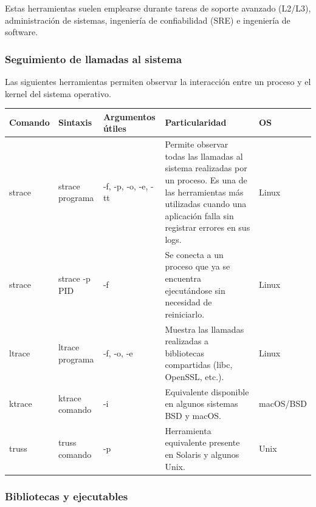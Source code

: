 \documentclass[a4paper,10pt]{article}
\begin{document}
Estas herramientas suelen emplearse durante tareas de soporte avanzado (L2/L3),
administración de sistemas, ingeniería de confiabilidad (SRE) e ingeniería de
software.


\subsubsection{Seguimiento de llamadas al sistema}

Las siguientes herramientas permiten observar la interacción entre un proceso y
el kernel del sistema operativo.

\begin{longtable}{|p{2.8cm}|p{3.3cm}|p{4cm}|p{5.3cm}|p{1.5cm}|}

\hline
Comando &
Sintaxis &
Argumentos útiles &
Particularidad &
OS
\\
\hline
\endhead

strace &
strace programa &
-f, -p, -o, -e, -tt &
Permite observar todas las llamadas al sistema realizadas por un proceso. Es una de las herramientas más utilizadas cuando una aplicación falla sin registrar errores en sus logs.
&
Linux
\\
\hline

strace &
strace -p PID &
-f &
Se conecta a un proceso que ya se encuentra ejecutándose sin necesidad de reiniciarlo.
&
Linux
\\
\hline

ltrace &
ltrace programa &
-f, -o, -e &
Muestra las llamadas realizadas a bibliotecas compartidas (libc, OpenSSL, etc.).
&
Linux
\\
\hline

ktrace &
ktrace comando &
-i &
Equivalente disponible en algunos sistemas BSD y macOS.
&
macOS/BSD
\\
\hline

truss &
truss comando &
-p &
Herramienta equivalente presente en Solaris y algunos Unix.
&
Unix
\\
\hline

\end{longtable}


\subsubsection{Bibliotecas y ejecutables}
\end{document}
